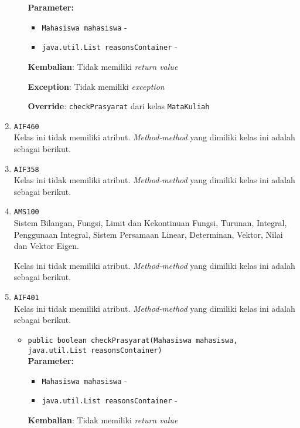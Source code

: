 \documentclass{article}
\begin{document}
\begin{enumerate}
\begin{itemize}
\textbf{Parameter:}\begin{itemize}
\item \texttt{Mahasiswa mahasiswa} - 
\item \texttt{java.util.List reasonsContainer} - 
\end{itemize}
\textbf{Kembalian}: Tidak memiliki \textit{return value}

\textbf{Exception}: Tidak memiliki \textit{exception}

\textbf{Override}: \texttt{checkPrasyarat} dari kelas \texttt{MataKuliah}

\end{itemize}
\item \texttt{AIF460}\\ 
Kelas ini tidak memiliki atribut. \textit{Method-method} yang dimiliki kelas ini adalah sebagai berikut.
\begin{itemize}
\end{itemize}
\item \texttt{AIF358}\\ 
Kelas ini tidak memiliki atribut. \textit{Method-method} yang dimiliki kelas ini adalah sebagai berikut.
\begin{itemize}
\end{itemize}
\item \texttt{AMS100}\\ 
Sistem Bilangan, Fungsi, Limit dan Kekontinuan Fungsi, Turunan, Integral, 
 Penggunaan Integral, Sistem Persamaan Linear, Determinan, Vektor, Nilai dan 
 Vektor Eigen.

Kelas ini tidak memiliki atribut. \textit{Method-method} yang dimiliki kelas ini adalah sebagai berikut.
\begin{itemize}
\end{itemize}
\item \texttt{AIF401}\\ 
Kelas ini tidak memiliki atribut. \textit{Method-method} yang dimiliki kelas ini adalah sebagai berikut.
\begin{itemize}
\item \texttt{public boolean checkPrasyarat(Mahasiswa mahasiswa, java.util.List reasonsContainer)}\\ 


\textbf{Parameter:}\begin{itemize}
\item \texttt{Mahasiswa mahasiswa} - 
\item \texttt{java.util.List reasonsContainer} - 
\end{itemize}
\textbf{Kembalian}: Tidak memiliki \textit{return value}


\end{itemize}
\end{enumerate}
\end{document}
